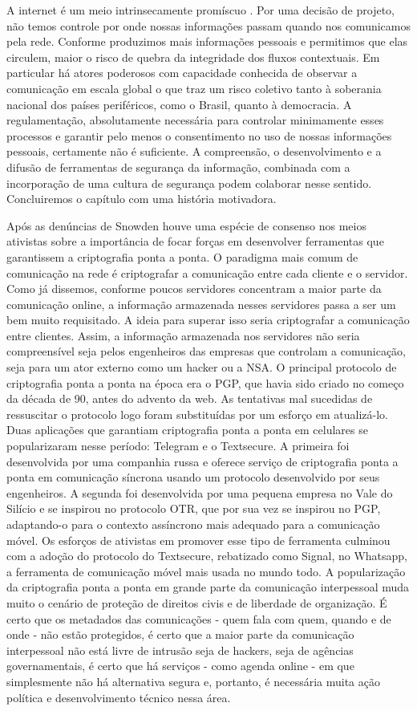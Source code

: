A internet é um meio intrinsecamente promíscuo \cite{}.
Por uma decisão de projeto, não temos controle por onde nossas informações passam quando nos comunicamos pela rede.
Conforme produzimos mais informações pessoais e permitimos que elas circulem, maior o risco de quebra da integridade dos fluxos contextuais.
Em particular há atores poderosos com capacidade conhecida de observar a comunicação em escala global o que traz um risco coletivo tanto à soberania nacional dos países periféricos, como o Brasil, quanto à democracia.
A regulamentação, absolutamente necessária para controlar minimamente esses processos e garantir pelo menos o consentimento no uso de nossas informações pessoais, certamente não é suficiente.
A compreensão, o desenvolvimento e a difusão de ferramentas de segurança da informação, combinada com a incorporação de uma cultura de segurança \cite{CulturaDeSeguranca} podem colaborar nesse sentido.
Concluiremos o capítulo com uma história motivadora.

Após as denúncias de Snowden houve uma espécie de consenso nos meios ativistas sobre a importância de focar forças em desenvolver ferramentas que garantissem a criptografia ponta a ponta.
O paradigma mais comum de comunicação na rede é criptografar a comunicação entre cada cliente e o servidor.
Como já dissemos, conforme poucos servidores concentram a maior parte da comunicação online, a informação armazenada nesses servidores passa a ser um bem muito requisitado.
A ideia para superar isso seria criptografar a comunicação entre clientes.
Assim, a informação armazenada nos servidores não seria compreensível seja pelos engenheiros das empresas que controlam a comunicação, seja para um ator externo como um hacker ou a NSA.
O principal protocolo de criptografia ponta a ponta na época era o PGP, que havia sido criado no começo da década de 90, antes do advento da web.
As tentativas mal sucedidas de ressuscitar o protocolo logo foram substituídas por um esforço em atualizá-lo.
Duas aplicações que garantiam criptografia ponta a ponta em celulares se popularizaram nesse período: Telegram e o Textsecure.
A primeira foi desenvolvida por uma companhia russa e oferece serviço de criptografia ponta a ponta em comunicação síncrona usando um protocolo desenvolvido por seus engenheiros.
A segunda foi desenvolvida por uma pequena empresa no Vale do Silício e se inspirou no protocolo OTR, que por sua vez se inspirou no PGP, adaptando-o para o contexto assíncrono mais adequado para a comunicação móvel.
Os esforços de ativistas em promover esse tipo de ferramenta culminou com a adoção do protocolo do Textsecure, rebatizado como Signal, no Whatsapp, a ferramenta de comunicação móvel mais usada no mundo todo.
A popularização da criptografia ponta a ponta em grande parte da comunicação interpessoal muda muito o cenário de proteção de direitos civis e de liberdade de organização.
É certo que os metadados das comunicações - quem fala com quem, quando e de onde - não estão protegidos, é certo que a maior parte da comunicação interpessoal não está livre de intrusão seja de hackers, seja de agências governamentais, é certo que há serviços - como agenda online - em que simplesmente não há alternativa segura e, portanto, é necessária muita ação política e desenvolvimento técnico nessa área.
